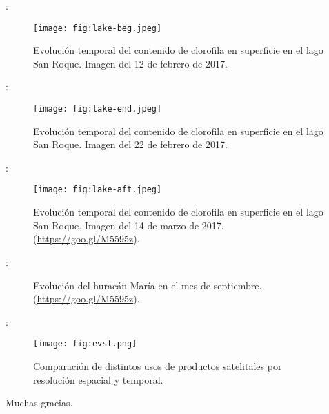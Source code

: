 \begin{frame}{\secname : \subsecname}
    \begin{figure}[h!]
        \centering
        \texttt{[image: fig:lake-beg.jpeg]}
        \caption{Evolución temporal del contenido de clorofila en superficie en el lago San Roque. Imagen del 12 de febrero de 2017.}
        \label{fig:lake-beg}
    \end{figure}
\end{frame}

\begin{frame}{\secname : \subsecname}
    \begin{figure}[h!]
        \centering
        \texttt{[image: fig:lake-end.jpeg]}
        \caption{Evolución temporal del contenido de clorofila en superficie en el lago San Roque. Imagen del 22 de febrero de 2017.}
        \label{fig:lake-end}
    \end{figure}
\end{frame}

\begin{frame}{\secname : \subsecname}
    \begin{figure}[h!]
        \centering
        \texttt{[image: fig:lake-aft.jpeg]}
        \caption{Evolución temporal del contenido de clorofila en superficie en el lago San Roque. Imagen del 14 de marzo de 2017. (\href{https://goo.gl/M5595z}{https://goo.gl/M5595z}).}
        \label{fig:lake-aft}
    \end{figure}
\end{frame}

\begin{frame}{\secname : \subsecname}
    \begin{figure}[h!]
    \centering
    \caption{Evolución del huracán María en el mes de septiembre. (\href{https://goo.gl/M5595z}{https://goo.gl/M5595z}).}
    \end{figure}
\end{frame}

\begin{frame}{\secname : \subsecname}
    \begin{figure}[h!]
        \centering
        \texttt{[image: fig:evst.png]}
        \caption{Comparación de distintos usos de productos satelitales por resolución espacial y temporal.}
        \label{fig:evst}
    \end{figure}
\end{frame}

\begin{frame}{\secname}
Muchas gracias.
\end{frame}

